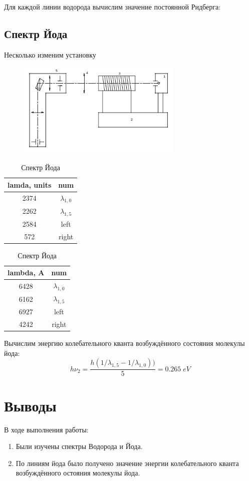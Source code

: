 \documentclass{article}
\begin{document}
Для каждой линии водорода вычислим значение постоянной Ридберга:

\subsection{Спектр Йода}
Несколько изменим установку

\begin{figure}[H]
	\centering
	\includegraphics[width=0.7\textwidth]{scheme-iodine.png}
\end{figure}

\begin{table}[H]
	\centering
\begin{tabular}{|c|c|}
	\hline
lamda, units & num							\\\hline
	2374         & \(\lambda_{1,0}\) \\\hline
2262         &  \(\lambda_{1,5}\)	\\\hline
2584         & left							\\\hline
572          & right						\\\hline
\end{tabular}
	\caption{Спектр Йода}
\end{table}

\begin{table}[H]
	\centering
\begin{tabular}{|c|c|}
	\hline
lambda, A         & num \\\hline
6428 & \(\lambda_{1,0}\)   \\\hline
6162 & \(\lambda_{1,5}\)   \\\hline
6927 & left					    \\\hline
4242 & right						\\\hline
\end{tabular}
	\caption{Спектр Йода}
\end{table}

Вычислим энергию колебательного кванта возбуждённого состояния молекулы йода:
\[ h\nu_2 = \frac{h(1/\lambda_{1,5} - 1/\lambda_{1,0}))}{5} = 0.265\; eV \]

\section{Выводы}
В ходе выполнения работы:
\begin{enumerate}
	\item Были изучены спектры Водорода и Йода.
	\item По линиям йода было получено значение энергии колебательного кванта
возбуждённого остояния молекулы йода.
\end{enumerate}
\end{document}
